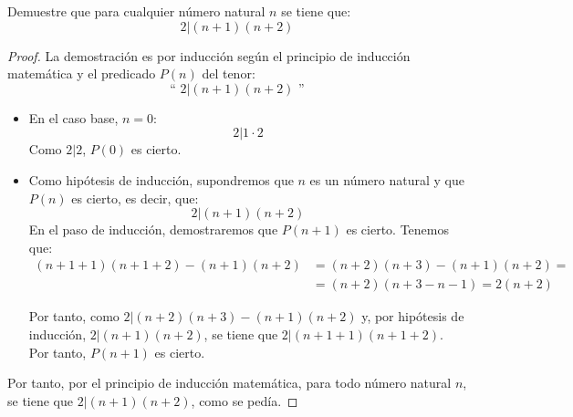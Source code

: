 \begin{ejercicio}\label{ej:2dividea_18}
    Demuestre que para cualquier número natural $n$ se tiene que:
    \begin{equation*}
        2|(n+1)(n+2)
    \end{equation*}
    \begin{proof}
        La demostración es por inducción según el principio de inducción matemática y el predicado $P(n)$ del tenor:
        \begin{equation*}
            \text{`` }2|(n+1)(n+2)\text{ ''}
        \end{equation*}

        \begin{itemize}
            \item En el caso base, $n=0$:
                \begin{equation*}
                    2|1\cdot 2
                \end{equation*}
                Como $2|2$, $P(0)$ es cierto.

            \item Como hipótesis de inducción, supondremos que $n$ es un número natural y que $P(n)$ es cierto, es decir, que:
                \begin{equation*}
                    2|(n+1)(n+2)
                \end{equation*}
                En el paso de inducción, demostraremos que $P(n+1)$ es cierto. Tenemos que:
                \begin{align*}
                    (n+1+1)(n+1+2) - (n+1)(n+2) &= (n+2)(n+3) - (n+1)(n+2) =\\
                    &= (n+2)(n+3-n-1) = 2(n+2)
                \end{align*}

                Por tanto, como $2|(n+2)(n+3) - (n+1)(n+2)$ y, por hipótesis de inducción, $2|(n+1)(n+2)$, se tiene que $2|(n+1+1)(n+1+2)$.
                Por tanto, $P(n+1)$ es cierto.
        \end{itemize}

        Por tanto, por el principio de inducción matemática, para todo número natural $n$, se tiene que $2|(n+1)(n+2)$, como se pedía.
    \end{proof}
\end{ejercicio}

